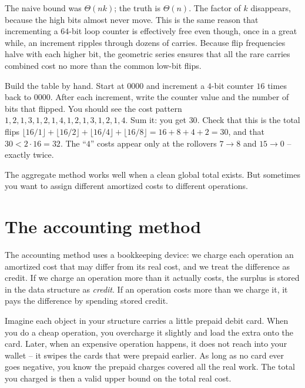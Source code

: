 \begin{aestheticbox}
The naive bound was $\Theta(nk)$; the truth is $\Theta(n)$. The factor of $k$
disappears, because the high bits almost never move. This is the same
reason that incrementing a $64$-bit loop counter is effectively free even though,
once in a great while, an increment ripples through dozens of carries. Because
flip frequencies halve with each higher bit, the geometric series ensures
that all the rare carries combined cost no more than the common low-bit flips.
\end{aestheticbox}

\begin{labbox}
Build the table by hand. Start at $0000$ and increment a $4$-bit counter $16$
times back to $0000$. After each increment, write the counter value and the number
of bits that flipped. You should see the cost pattern
$1,2,1,3,1,2,1,4,1,2,1,3,1,2,1,4$. Sum it: you get $30$. Check that this is the
total flips $\lfloor 16/1\rfloor + \lfloor 16/2\rfloor + \lfloor 16/4\rfloor +
\lfloor 16/8\rfloor = 16+8+4+2 = 30$, and that $30 < 2 \cdot 16 = 32$. The
``$4$'' costs appear only at the rollovers $7\to8$ and $15\to0$ -- exactly twice.
\end{labbox}

The aggregate method works well when a clean global total exists. But sometimes
you want to assign different amortized costs to different operations.

\section{The accounting method}

The accounting method uses a bookkeeping device: we charge each operation an
amortized cost that may differ from its real cost, and we treat the difference as
credit. If we charge an operation more than it actually costs, the surplus
is stored in the data structure as \emph{credit}. If an operation costs more than
we charge it, it pays the difference by spending stored credit.

\begin{intuitionbox}
Imagine each object in your structure carries a little prepaid debit card. When
you do a cheap operation, you overcharge it slightly and load the extra onto the
card. Later, when an expensive operation happens, it does not reach into your
wallet -- it swipes the cards that were prepaid earlier. As long as no card ever
goes negative, you know the prepaid charges covered all the real work. The total
you charged is then a valid upper bound on the total real cost.
\end{intuitionbox}

